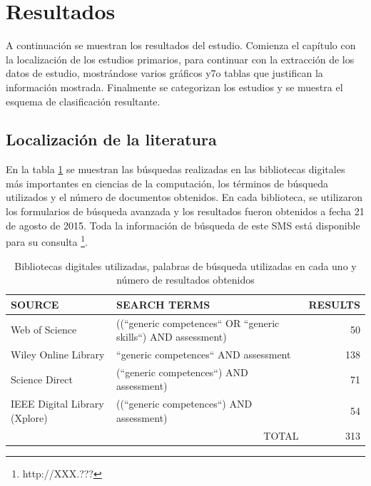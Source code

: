 \section{Resultados}

A continuación se muestran los resultados del estudio. Comienza el capítulo con la localización de los estudios primarios, para continuar con la extracción de los datos de estudio, mostrándose varios gráficos y7o tablas que justifican la información mostrada. Finalmente se categorizan los estudios y se muestra el esquema de clasificación resultante.

\subsection{Localización de la literatura}

En la tabla \ref{tab:ResumenBusquedaResultados} se muestran las búsquedas realizadas en las bibliotecas digitales más importantes en ciencias de la computación, los términos de búsqueda utilizados y el número de documentos obtenidos. En cada biblioteca, se utilizaron los formularios de búsqueda avanzada y los resultados fueron obtenidos a fecha 21 de agosto de 2015. Toda la información de búsqueda de este SMS está disponible para su consulta \footnote{http://XXX.???}.


\begin{table}
  \begin{center}
  \begin{tabular}{| p{4cm} | p{8cm} | r |}
    \hline
    SOURCE & SEARCH TERMS & RESULTS\\
    \hline
    \hline
    Web of Science & ((``generic competences`` OR ``generic skills``) AND assessment) & 50 \\
    \hline
    Wiley Online Library & ``generic competences`` AND assessment &  138 \\
    \hline
    Science Direct & (``generic competences``) AND assessment) &  71 \\
    \hline
    IEEE Digital Library (Xplore) & ((``generic competences``) AND assessment) & 54 \\
    \hline
    \hline
    \multicolumn{2}{|r|}{TOTAL} & 313\\
    \hline
  \end{tabular}
\end{center}
\caption{Bibliotecas digitales utilizadas, palabras de búsqueda utilizadas en cada uno y número de resultados obtenidos}
\label{tab:ResumenBusquedaResultados}
\end{table} 

